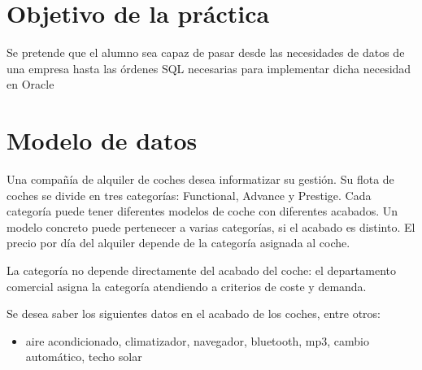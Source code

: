 
\usepackage{eurosym}





\renewcommand{\hmwkTitle}{Diseño E/R, paso a SQL e inserción de datos}
\renewcommand{\hmwkClass}{Gestión de Bases de Datos}

\usepackage{enumitem}%






\primerapagina


\section{Objetivo de la práctica}
Se pretende que el alumno sea capaz de pasar desde las necesidades de datos de una empresa hasta las órdenes SQL necesarias para implementar dicha necesidad en Oracle

\section{Modelo de datos}
Una compañía de alquiler de coches desea informatizar su gestión.  Su flota de coches se divide en tres categorías: Functional, Advance y Prestige. Cada categoría puede tener diferentes modelos de coche con diferentes acabados. Un modelo concreto puede pertenecer a varias categorías, si el acabado es distinto. El precio por día del alquiler depende de la categoría asignada al coche.

La categoría no depende directamente del acabado del coche: el departamento comercial asigna la categoría atendiendo a criterios de coste y demanda.

Se desea saber los siguientes datos en el acabado de los coches, entre otros:
\begin{itemize}
\item aire acondicionado, climatizador, navegador, bluetooth, mp3, cambio automático, techo solar
\end{itemize}

